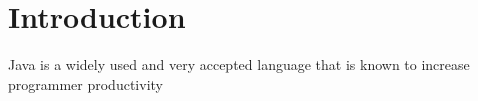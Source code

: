 \chapter{Introduction}
\label{chapter:introduction}
Java is a widely used and very accepted language that is known to increase programmer productivity 